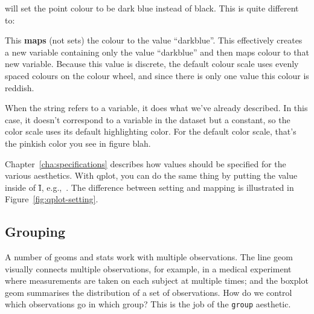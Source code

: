 % 


\noindent will set the point colour to be dark blue instead of black.  This is quite different to:

% 


\noindent This {\bf maps} (not sets) the colour to the value ``darkblue''.  This effectively creates a new variable containing only the value  ``darkblue'' and then maps colour to that new variable.  Because this value is discrete, the default colour scale uses evenly spaced colours on the colour wheel, and since there is only one value this colour is reddish.

When the string refers to a variable, it does what we've already described.  In this case, it doesn't correspond to a variable in the dataset but a constant, so the color scale uses its default highlighting color.  For the default color scale, that's the pinkish color you see in figure blah.

Chapter~\ref{cha:specifications} describes how values should be specified for the various aesthetics.  With qplot, you can do the same thing by putting the value inside of \f{I}, e.g.,\ .  The difference between setting and mapping is illustrated in Figure~\ref{fig:qplot-setting}.  

% 


\subsection{Grouping}
\label{sub:grouping}

A number of geoms and stats work with multiple observations.  The line geom visually connects multiple observations, for example, in a medical experiment where measurements are taken on each subject at multiple times; and the boxplot geom summarises the distribution of a set of observations.  How do we control which observations go in which group?  This is the job of the {\tt group} aesthetic.

